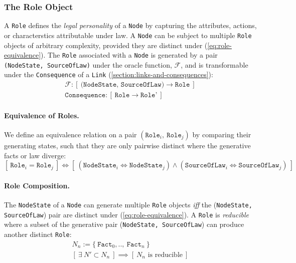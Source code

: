 \documentclass{article}
\numberwithin{equation}{section}
\begin{document}
\subsubsection{The Role Object} \label{section:role-object}

A \texttt{Role} defines the \textit{legal personality} of a \texttt{Node} by capturing the attributes, actions, or characterstics attributable under law. A \texttt{Node} can be subject to multiple \texttt{Role} objects of arbitrary complexity, provided they are distinct under (\ref{eq:role-equivalence}). The \texttt{Role} associated with a \texttt{Node} is generated by a pair \texttt{(NodeState, SourceOfLaw)} under the oracle function, $\mathcal{F}$, and is transformable under the \texttt{Consequence} of a \texttt{Link} (\ref{section:links-and-consequences}): 
\begin{align}	
	\mathcal{F} : [ \ \texttt{(NodeState, SourceOfLaw)} \rightarrow \texttt{Role} \ ] \\
	\texttt{Consequence} : [ \ \texttt{Role} \rightarrow \texttt{Role'} \ ]
\end{align}

\paragraph{Equivalence of Roles.} We define an equivalence relation on a pair $(\texttt{Role}_i, \ \texttt{Role}_j)$ by comparing their generating states, such that they are only pairwise distinct where the generative facts or law diverge:  
\begin{equation}\label{eq:role-equivalence}
[ \ \texttt{Role}_i = \texttt{Role}_j \ ] \iff [ \ (\texttt{NodeState}_i \iff \texttt{NodeState}_j) \land (\texttt{SourceOfLaw}_i \iff \texttt{SourceOfLaw}_j) \ ]
\end{equation}

\paragraph{Role Composition.} The \texttt{NodeState} of a \texttt{Node} can generate multiple \texttt{Role} objects \textit{iff} the (\texttt{NodeState, SourceOfLaw}) pair are distinct under (\ref{eq:role-equivalence}). A \texttt{Role} is \textit{reducible} where a subset of the generative pair (\texttt{NodeState, SourceOfLaw}) can produce another distinct \texttt{Role}:
\begin{align}
	N_n := \{ \ \texttt{Fact}_0, .., \ \texttt{Fact}_n \ \} \\
	[ \ \exists \ N' \subset N_n \ ] \implies [ \ \text{$N_n$ is reducible} \ ] 
\end{align}
\end{document}
